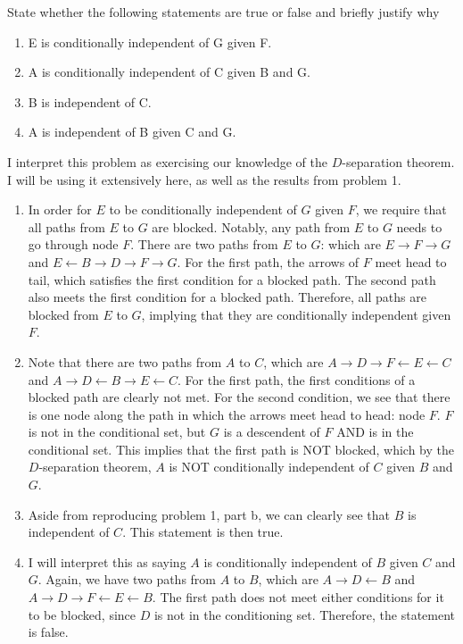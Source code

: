 \newcommand{\from}{\leftarrow}
State whether the following statements are true or false and briefly justify why
\begin{enumerate}
    \item E is conditionally independent of G given F.
    \item A is conditionally independent of C given B and G.
    \item B is independent of C.
    \item A is independent of B given C and G.
\end{enumerate}
\partbreak
\begin{solution}

    I interpret this problem as exercising our knowledge of the $D$-separation theorem. I will be using it extensively here, as well as the results from problem 1. 
    \begin{enumerate}
        \item In order for $E$ to be conditionally independent of $G$ given $F$, we require that all paths from $E$ to $G$ are blocked. Notably, any path from $E$ to $G$ needs to go through node $F$. There are two paths from $E$ to $G$: which are $E \to F \to G$ and $E \from B \to D \to F \to G$. For the first path, the arrows of $F$ meet head to tail, which satisfies the first condition for a blocked path. The second path also meets the first condition for a blocked path. Therefore, all paths are blocked from $E$ to $G$, implying that they are conditionally independent given $F$. 
        \item Note that there are two paths from $A$ to $C$, which are $A \to D \to F \from E \from C$ and $A \to  D \from B \to E \from C$. For the first path, the first conditions of a blocked path are clearly not met. For the second condition, we see that there is one node along the path in which the arrows meet head to head: node $F$. $F$ is not in the conditional set, but $G$ is a descendent of $F$ AND is in the conditional set. This implies that the first path is NOT blocked, which by the $D$-separation theorem, $A$ is NOT conditionally independent of $C$ given $B$ and $G$. 
        \item Aside from reproducing problem 1, part b, we can clearly see that $B$ is independent of $C$. This statement is then true.
        \item I will interpret this as saying $A$ is conditionally independent of $B$ given $C$ and $G$. Again, we have two paths from $A$ to $B$, which are $A \to D \from B$ and $A \to D \to F \from E \from B$. The first path does not meet either conditions for it to be blocked, since $D$ is not in the conditioning set. Therefore, the statement is false.  
    \end{enumerate}
\end{solution}

